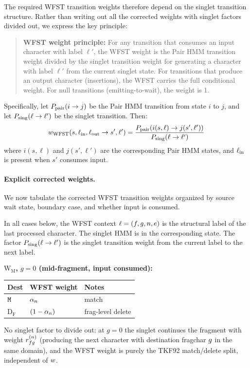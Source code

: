 The required WFST transition weights therefore depend on the singlet transition structure.
Rather than writing out all the corrected weights with singlet factors divided out,
we express the key principle:

\begin{quote}
\textbf{WFST weight principle:}
For any transition that consumes an input character with label $\ell'$,
the WFST weight is the Pair HMM transition weight divided by the singlet
transition weight for generating a character with label $\ell'$ from the current
singlet state.
For transitions that produce an output character (insertions), the WFST
carries the full conditional weight.
For null transitions (emitting-to-wait), the weight is 1.
\end{quote}

Specifically, let $P_{\rm pair}(i \to j)$ be the Pair HMM transition from state $i$ to $j$,
and let $P_{\rm sing}(\ell \to \ell')$ be the singlet transition.
Then:
\begin{equation}
\label{eq:wfst-weight-principle}
w_{\rm WFST}(s, \ell_{\rm in}, \ell_{\rm out} \to s', \ell') =
\frac{P_{\rm pair}(i(s,\ell) \to j(s',\ell'))}{P_{\rm sing}(\ell \to \ell')}
\end{equation}
where $i(s,\ell)$ and $j(s',\ell')$ are the corresponding Pair HMM states,
and $\ell_{\rm in}$ is present when $s'$ consumes input.

\paragraph{Explicit corrected weights.}

We now tabulate the corrected WFST transition weights organized by source wait state,
boundary case, and whether input is consumed.

In all cases below, the WFST context $\ell = (f, g, n, e)$ is the structural label
of the last processed character. The singlet HMM is in the corresponding state.
The factor $P_{\rm sing}(\ell \to \ell')$ is the singlet transition weight from the
current label to the next label.

\bigskip
\noindent\textbf{$\mathrm{W_M}$, $g=0$ (mid-fragment, input consumed):}

\begin{center}
\renewcommand{\arraystretch}{1.4}
\begin{tabular}{lll}
\hline
Dest & WFST weight & Notes \\
\hline
${\tt M}$ & $\alpha_n$ & match \\
$\mathrm{D_F}$ & $(1-\alpha_n)$ & frag-level delete \\
\hline
\end{tabular}
\end{center}
No singlet factor to divide out: at $g=0$ the singlet continues the fragment
with weight $r^{(n)}_{fg}$ (producing the next character
with destination fragchar $g$ in the same domain), and the WFST
weight is purely the TKF92 match/delete split, independent of $w$.

